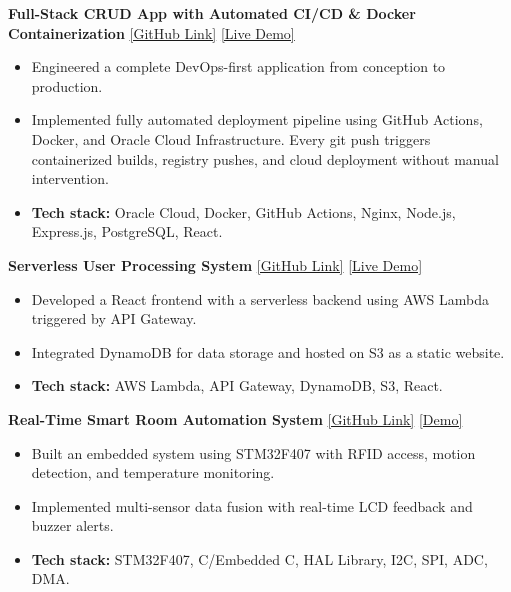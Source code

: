 \documentclass[a4paper,10.5pt]{article}
\begin{document}
\textbf{Full-Stack CRUD App with Automated CI/CD \& Docker Containerization} \hfill
{\small \href{https://github.com/Muhammad-Ahmad17/root}{[GitHub Link]} \enspace \href{https://cicd.aahmad.app/}{[Live Demo]}}
\begin{itemize}[nosep, leftmargin=1.5em, topsep=2pt]
  \item Engineered a complete DevOps-first application from conception to production.
  \item Implemented fully automated deployment pipeline using GitHub Actions, Docker, and Oracle Cloud Infrastructure. Every git push triggers containerized builds, registry pushes, and cloud deployment without manual intervention.
  \item \textbf{Tech stack:} Oracle Cloud, Docker, GitHub Actions, Nginx, Node.js, Express.js, PostgreSQL, React.
\end{itemize}
\textbf{Serverless User Processing System} \hfill
{\small \href{https://github.com/Muhammad-Ahmad17/getApiForUserData}{[GitHub Link]} \enspace \href{http://user-processing-system-ahmad.s3-website-us-east-1.amazonaws.com/}{[Live Demo]}}
\begin{itemize}[nosep, leftmargin=1.5em, topsep=2pt]
  \item Developed a React frontend with a serverless backend using AWS Lambda triggered by API Gateway.
  \item Integrated DynamoDB for data storage and hosted on S3 as a static website.
  \item \textbf{Tech stack:} AWS Lambda, API Gateway, DynamoDB, S3, React.
\end{itemize}

\textbf{Real-Time Smart Room Automation System} \hfill
{\small \href{https://github.com/Muhammad-Ahmad17/RealTimeSmartRoomAutomation}{[GitHub Link]} \enspace \href{https://www.aahmad.app/projects/brokendemo.mp4}{[Demo]}}
\begin{itemize}[nosep, leftmargin=1.5em, topsep=2pt]
 \item Built an embedded system using STM32F407 with RFID access, motion detection, and temperature monitoring.
 \item Implemented multi-sensor data fusion with real-time LCD feedback and buzzer alerts.
 \item \textbf{Tech stack:} STM32F407, C/Embedded C, HAL Library, I2C, SPI, ADC, DMA.
\end{itemize}
\end{document}
